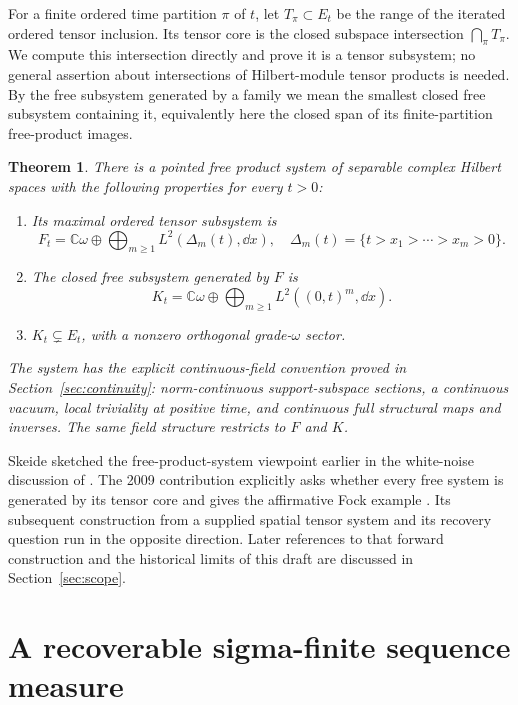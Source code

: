 \documentclass[11pt]{article}
\newtheorem{theorem}{Theorem}
\theoremstyle{remark}\newtheorem{remark}[theorem]{Remark}
\newcommand{\C}{\mathbb C}\newcommand{\F}{\mathcal F}
\newcommand{\vac}{\omega}\newcommand{\fp}{\mathbin{\circledast}}
\begin{document}
For a finite ordered time partition $\pi$ of $t$, let $T_\pi\subset E_t$
be the range of the iterated ordered tensor inclusion. Its tensor core is the
closed subspace intersection $\bigcap_\pi T_\pi$. We compute this intersection
directly and prove it is a tensor subsystem; no general assertion about
intersections of Hilbert-module tensor products is needed. By the free subsystem
generated by a family we mean the smallest closed free subsystem containing it,
equivalently here the closed span of its finite-partition free-product images.

\begin{theorem}\label{thm:main}
There is a pointed free product system of separable complex Hilbert spaces with
the following properties for every $t>0$:
\begin{enumerate}[label=\textup{(\roman*)}]
\item Its maximal ordered tensor subsystem is
\[
 F_t=\C\vac\oplus\bigoplus_{m\geq1}L^2(\Delta_m(t),\dd x),
 \quad\Delta_m(t)=\{t>x_1>\cdots>x_m>0\}.
\]
\item The closed free subsystem generated by $F$ is
\[
 K_t=\C\vac\oplus\bigoplus_{m\geq1}L^2((0,t)^m,\dd x).
\]
\item $K_t\subsetneq E_t$, with a nonzero orthogonal grade-$\omega$ sector.
\end{enumerate}
The system has the explicit continuous-field convention proved in
Section~\ref{sec:continuity}: norm-continuous support-subspace sections, a
continuous vacuum, local triviality at positive time, and continuous full
structural maps and inverses. The same field structure restricts to $F$ and $K$.
\end{theorem}

Skeide sketched the free-product-system viewpoint earlier in the white-noise
discussion of \cite[Section~10.2]{Skeide2006}. The 2009 contribution explicitly
asks whether every free system is generated by its tensor core and gives the
affirmative Fock example \cite[p.~530]{Skeide2009}. Its subsequent construction
from a supplied spatial tensor system and its recovery question run in the
opposite direction. Later references to that forward construction and the
historical limits of this draft are discussed in Section~\ref{sec:scope}.

\section{A recoverable sigma-finite sequence measure}\label{sec:measure}
\end{document}
